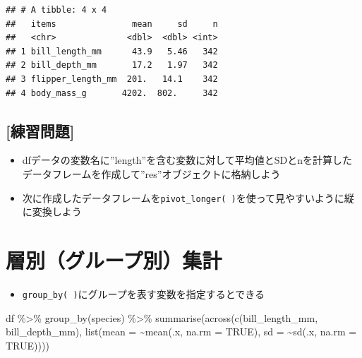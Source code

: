 \documentclass[
  xelatex,ja=standard, b5paper]{bxjsbook}
\newenvironment{Shaded}{\begin{snugshade}}{\end{snugshade}}
\newcommand{\AttributeTok}[1]{\textcolor[rgb]{0.77,0.63,0.00}{#1}}
\newcommand{\ConstantTok}[1]{\textcolor[rgb]{0.00,0.00,0.00}{#1}}
\newcommand{\FunctionTok}[1]{\textcolor[rgb]{0.00,0.00,0.00}{#1}}
\newcommand{\NormalTok}[1]{#1}
\newcommand{\SpecialCharTok}[1]{\textcolor[rgb]{0.00,0.00,0.00}{#1}}
\providecommand{\tightlist}{%
  \setlength{\itemsep}{0pt}\setlength{\parskip}{0pt}}
\begin{document}
\begin{verbatim}
## # A tibble: 4 x 4
##   items               mean     sd     n
##   <chr>              <dbl>  <dbl> <int>
## 1 bill_length_mm      43.9   5.46   342
## 2 bill_depth_mm       17.2   1.97   342
## 3 flipper_length_mm  201.   14.1    342
## 4 body_mass_g       4202.  802.     342
\end{verbatim}

\hypertarget{ux7df4ux7fd2ux554fux984c-15}{%
\subsection{{[}練習問題{]}}\label{ux7df4ux7fd2ux554fux984c-15}}

\begin{itemize}
\tightlist
\item
  dfデータの変数名に''length''を含む変数に対して平均値とSDとnを計算したデータフレームを作成して''res''オブジェクトに格納しよう
\item
  次に作成したデータフレームを\texttt{pivot\_longer(\ )}を使って見やすいように縦に変換しよう
\end{itemize}

\hypertarget{su-group}{%
\section{層別（グループ別）集計}\label{su-group}}

\begin{itemize}
\tightlist
\item
  \texttt{group\_by(\ )}にグループを表す変数を指定するとできる
\end{itemize}

\begin{Shaded}
\begin{Highlighting}[]
\NormalTok{df }\SpecialCharTok{\%\textgreater{}\%} 
  \FunctionTok{group\_by}\NormalTok{(species) }\SpecialCharTok{\%\textgreater{}\%} 
  \FunctionTok{summarise}\NormalTok{(}\FunctionTok{across}\NormalTok{(}\FunctionTok{c}\NormalTok{(bill\_length\_mm, bill\_depth\_mm),}
                   \FunctionTok{list}\NormalTok{(}\AttributeTok{mean =} \SpecialCharTok{\textasciitilde{}}\FunctionTok{mean}\NormalTok{(.x, }\AttributeTok{na.rm =} \ConstantTok{TRUE}\NormalTok{),}
                        \AttributeTok{sd =} \SpecialCharTok{\textasciitilde{}}\FunctionTok{sd}\NormalTok{(.x, }\AttributeTok{na.rm =} \ConstantTok{TRUE}\NormalTok{))))}
\end{Highlighting}
\end{Shaded}
\end{document}
